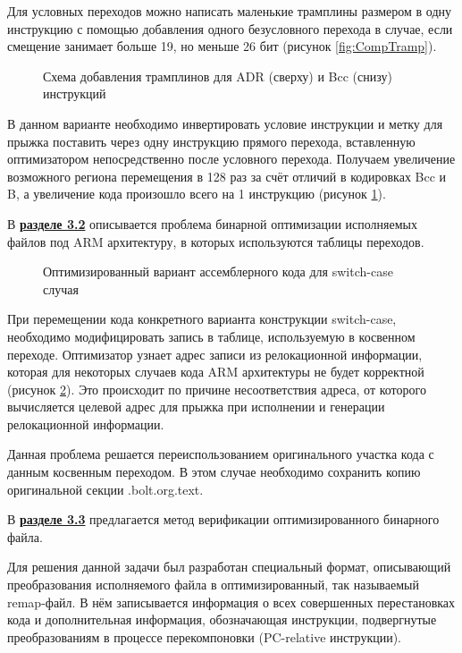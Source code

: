 Для условных переходов можно написать маленькие трамплины размером в одну инструкцию с помощью добавления одного безусловного перехода в случае, если смещение занимает больше 19, но меньше 26 бит (рисунок \cref{fig:CompTramp}).
 
\begin{figure}[H]
    \caption{Схема добавления трамплинов для ADR (сверху) и Bcc (снизу) инструкций}\label{fig:Tramp}
\end{figure}

В данном варианте необходимо инвертировать условие инструкции и метку для прыжка поставить через одну инструкцию прямого перехода, вставленную оптимизатором непосредственно после условного перехода. Получаем увеличение возможного региона перемещения в 128 раз за счёт отличий в кодировках Bcc и B, а увеличение кода произошло всего на 1 инструкцию (рисунок \cref{fig:Tramp}).

В \underline{\textbf{разделе 3.2}} описывается проблема бинарной оптимизации исполняемых файлов под ARM архитектуру, в которых используются таблицы переходов.

\begin{figure}[!h]
    \centerfloat{
        \texttt{[image: jt4]}
    }
    \caption{Оптимизированный вариант ассемблерного кода для switch-case случая}\label{fig:Switch}
\end{figure}

При перемещении кода конкретного варианта конструкции switch-case, необходимо модифицировать запись в таблице, используемую в косвенном переходе. Оптимизатор узнает адрес записи из релокационной информации, которая для некоторых случаев кода ARM архитектуры не будет корректной (рисунок \cref{fig:Switch}). Это происходит по причине несоответствия адреса, от которого вычисляется целевой адрес для прыжка при исполнении и генерации релокационной информации.

Данная проблема решается переиспользованием оригинального участка кода с данным косвенным переходом. В этом случае необходимо сохранить копию оригинальной секции .bolt.org.text.

В \underline{\textbf{разделе 3.3}} предлагается метод верификации оптимизированного бинарного файла.

Для решения данной задачи был разработан специальный формат, описывающий преобразования исполняемого файла в оптимизированный, так называемый remap-файл. В нём записывается информация о всех совершенных перестановках кода и дополнительная информация, обозначающая инструкции, подвергнутые преобразованиям в процессе перекомпоновки (PC-relative инструкции).

